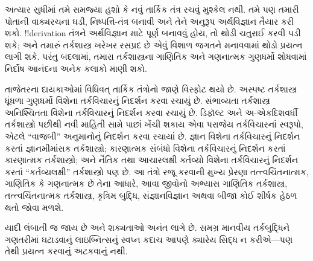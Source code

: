 \documentclass[../../../include/open-logic-section]{subfiles}
\begin{document}


અત્યાર સુધીમાં તમે સમજ્યા હશો કે નવું તાર્કિક તંત્ર રચવું મુશ્કેલ નથી.
તમે પણ તમારી પોતાની વાક્યરચના ઘડી, નિષ્પત્તિ-તંત્ર બનાવી અને તેને
અનુરૂપ અર્થવિજ્ઞાન તૈયાર કરી શકો. !!{derivation} તંત્રને અર્થવિજ્ઞાન
માટે પૂર્ણ બનાવવું હોય, તો થોડી ચતુરાઈ કરવી પડી શકે; અને તમારું
તર્કશાસ્ત્ર ખરેખર રસપ્રદ છે એવું વિશાળ જગતને મનાવવામાં થોડો પ્રયત્ન
લાગી શકે. પરંતુ બદલામાં, તમારા તર્કશાસ્ત્રના ગાણિતિક અને ગણનાત્મક
ગુણધર્મો શોધવામાં નિર્દોષ આનંદના અનેક કલાકો માણી શકો.

તાજેતરના દાયકાઓમાં વિધિવત્ તાર્કિક તંત્રોનો જાણે વિસ્ફોટ થયો છે.
અસ્પષ્ટ તર્કશાસ્ત્ર ધૂંધળા ગુણધર્મો વિશેના તર્કવિચારનું નિદર્શન કરવા
રચાયું છે. સંભાવ્યતા તર્કશાસ્ત્ર અનિશ્ચિતતા વિશેના તર્કવિચારનું
નિદર્શન કરવા રચાયું છે. ડિફૉલ્ટ અને અ-એકદિશવર્ધી તર્કશાસ્ત્રો પછીથી
નવી માહિતી સામે પાછાં ખેંચી શકાય એવા પરાજેય તર્કવિચારનાં સ્વરૂપો,
એટલે ``વાજબી'' અનુમાનોનું નિદર્શન કરવા રચાયાં છે. જ્ઞાન વિશેના
તર્કવિચારનું નિદર્શન કરતાં જ્ઞાનમીમાંસક તર્કશાસ્ત્રો; કારણાત્મક
સંબંધો વિશેના તર્કવિચારનું નિદર્શન કરતાં કારણાત્મક તર્કશાસ્ત્રો; અને
નૈતિક તથા આચારલક્ષી કર્તવ્યો વિશેના તર્કવિચારનું નિદર્શન કરતાં
``કર્તવ્યલક્ષી'' તર્કશાસ્ત્રો પણ છે. આ તંત્રો રજૂ કરવાની મુખ્ય પ્રેરણા
તત્ત્વચિંતનાત્મક, ગાણિતિક કે ગણનાત્મક છે તેના આધારે, આવા જીવોનો અભ્યાસ
ગાણિતિક તર્કશાસ્ત્ર, તત્ત્વચિંતનાત્મક તર્કશાસ્ત્ર, કૃત્રિમ બુદ્ધિ,
સંજ્ઞાનવિજ્ઞાન અથવા બીજા કોઈ શીર્ષક હેઠળ થતો જોવા મળશે.

યાદી લંબાતી જ જાય છે અને શક્યતાઓ અનંત લાગે છે. સમગ્ર માનવીય
તર્કબુદ્ધિને ગણતરીમાં ઘટાડવાનું લાઇબ્નિત્સનું સ્વપ્ન કદાચ આપણે ક્યારેય
સિદ્ધ ન કરીએ---પણ તેથી પ્રયત્ન કરવાનું અટકવાનું નથી.
\end{document}
